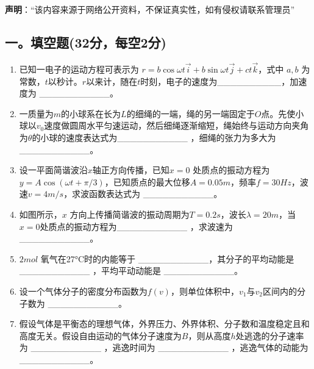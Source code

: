
\textbf{声明}：“该内容来源于网络公开资料，不保证真实性，如有侵权请联系管理员”

\subsection{一。填空题(32分，每空2分)}
\begin{enumerate}
    \item 已知一电子的运动方程可表示为 $r = b \cos \omega t\vec{i} + b \sin \omega t\vec{j} + ct\vec{k}$，式中 $a,b$ 为常数，$t$以秒计。$r$以来计，随在$t$时刻，电子的速度为__________，加速度为 ___________。
    \item 一质量为$m$的小球系在长为$L$的细绳的一端，绳的另一端固定于$O$点。先使小球以$v_0$速度做圆周水平匀速运动，然后细绳逐渐缩短，绳始终与运动方向夹角为$\theta$的小球的速度表达式为___________ ，细绳的张力为多大为 ___________。
    \item 设一平面简谐波沿$x$轴正方向传播，已知$x = 0$ 处质点的振动方程为$y = A \cos (\omega t + \pi/3)$，已知质点的最大位移$A=0.05m$，频率$f=30Hz$，波速$v=4m/s$，求波函数表达式为 ___________。
    \item 如图所示，$x$ 方向上传播简谐波的振动周期为$T = 0.2s$，波长$\lambda = 20m$，当$x = 0$处质点的振动方程为___________ ，求波速为 ___________。
    \item $2 mol$ 氧气在27°C时的内能等于 ___________，其分子的平均动能是 ___________ ，平均平动动能是 ___________。
    \item 设一个气体分子的密度分布函数为$f(v)$，则单位体积中，$v_1$与$v_2$区间内的分子数为 ___________。
    \item 假设气体是平衡态的理想气体，外界压力、外界体积、分子数和温度稳定且和高度无关。假设自由运动的气体分子速度为$B$，则从高度$h$处逃逸的分子速率为 ___________ ，逃逸时间为 ___________ ，逃逸气体的动能为 ___________。
\end{enumerate}
